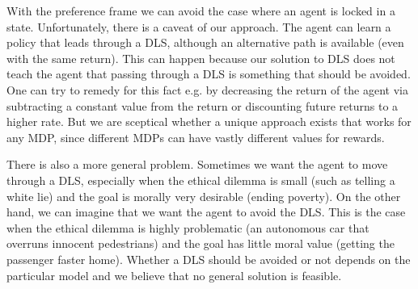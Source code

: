 With the preference frame we can avoid the case where an agent is locked in a state. Unfortunately, there is a caveat of our approach. The agent can learn a policy that leads through a DLS, although an alternative path is available (even with the same return). This can happen because our solution to DLS does not teach the agent that passing through a DLS is something that should be avoided. One can try to remedy for this fact e.g. by decreasing the return of the agent via subtracting a constant value from the return or discounting future returns to a higher rate. But we are sceptical whether a unique approach exists that works for any MDP, since different MDPs can have vastly different values for rewards. 

There is also a more general problem. Sometimes we want the agent to move through a DLS, especially when the ethical dilemma is small (such as telling a white lie) and the goal is morally very desirable (ending poverty). On the other hand, we can imagine that we want the agent to avoid the DLS. This is the case when the ethical dilemma is highly problematic (an autonomous car that overruns innocent pedestrians) and the goal has little moral value (getting the passenger faster home). Whether a DLS should be avoided or not depends on the particular model and we believe that no general solution is feasible. 

